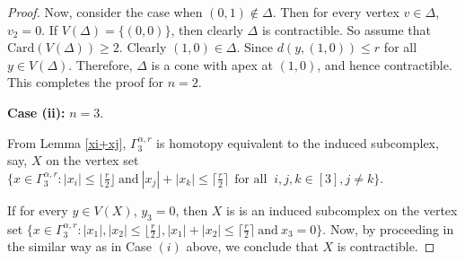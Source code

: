 \documentclass{amsart}
\theoremstyle{definition}
\theoremstyle{remark}
\numberwithin{equation}{section}
\newcommand{\D}{\Delta}
\newcommand{\f}{\lfloor\frac{r}{2}\rfloor}
\newcommand{\cil}{\lceil\frac{r}{2}\rceil}
\def\n{{\mathrm{N}}}
\begin{document}
\begin{proof}
	
	Now, consider the case when $(0,1)\notin\D$.  Then for every vertex $v\in \D$, $v_2=0$.  If $V(\Delta)= \{(0, 0)\}$, then clearly $\Delta$ is contractible. So assume that $\mathrm{Card}(V(\Delta)) \geq 2$. Clearly $(1, 0) \in \D$.  Since $d(y,(1, 0))\leq r$ for all $y\in V(\D)$. Therefore, $\D$ is a cone with apex at $(1, 0)$, and hence contractible. This completes the proof for $n = 2$.
	
	
	
	
	\noindent\textbf{Case (ii):} $n = 3$.  
	
	From Lemma \ref{xi+xj}, $\Gamma_3^{\alpha,r}$ is homotopy equivalent to the induced subcomplex, say, $X$ on the vertex set $\{x \in \Gamma_3^{\alpha, r} : |x_i| \leq \f \ \text{and} \ |x_j| + |x_k| \leq \cil \ \ \text{for all } \ i,j,k\in [3], j\neq k\}$.
	
	If for every $y \in V(X)$, $y_3 = 0$, then $X$ is is an induced subcomplex on the vertex set $\{x \in \Gamma_3^{\alpha, r} : |x_1|, |x_2| \leq \f, |x_1| + |x_2| \leq \cil \ \text{and} \ x_3 = 0\}$. Now, by proceeding in the similar way as in Case $(i)$ above, we conclude that $X$ is contractible. 
    
    
    


\end{proof}
\end{document}

